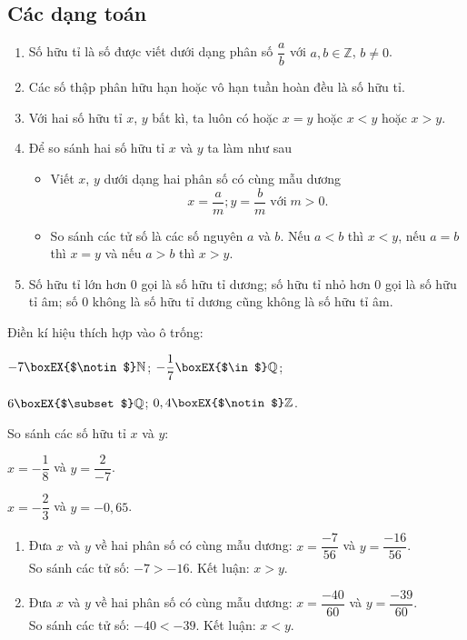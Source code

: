 \subsection{Các dạng toán}
\begin{dang}
\begin{enumerate}[\tickEX]
	\item Số hữu tỉ là số được viết dưới dạng phân số $\dfrac{a}{b}$ với $a, b\in\mathbb{Z}$, $b\not=0$.
	\item Các số thập phân hữu hạn hoặc vô hạn tuần hoàn đều là số hữu tỉ.
	\item Với hai số hữu tỉ $x$, $y$ bất kì, ta luôn có hoặc $x=y$ hoặc $x<y$ hoặc $x>y$.
	\item Để so sánh hai số hữu tỉ $x$ và $y$ ta làm như sau
		\begin{itemize}
			\item Viết $x$, $y$ dưới dạng hai phân số có cùng mẫu dương $$x=\dfrac{a}{m}; y=\dfrac{b}{m}\;\text{với}\;m>0.$$
			\item So sánh các tử số là các số nguyên $a$ và $b$. Nếu $a<b$ thì $x<y$, nếu $a=b$ thì $x=y$ và nếu $a>b$ thì $x>y$.
		\end{itemize}
	\item Số hữu tỉ lớn hơn $0$ gọi là số hữu tỉ dương; số hữu tỉ nhỏ hơn $0$ gọi là số hữu tỉ âm; số $0$ không là số hữu tỉ dương cũng không là số hữu tỉ âm.
\end{enumerate}
\end{dang}

\begin{vd}
Điền kí hiệu thích hợp vào ô trống:
\begin{listEX}[2]
\item $-7\boxEX{$\notin$}\mathbb{N}$; $-\dfrac{1}{7}\boxEX{$\in$}\mathbb{Q}$;
\item $6\boxEX{$\subset$}\mathbb{Q}$; $0,4\boxEX{$\notin$}\mathbb{Z}$.
\end{listEX}
\end{vd}

\begin{vd}
So sánh các số hữu tỉ $x$ và $y$:
\begin{listEX}[2]
	\item $x=-\dfrac{1}{8}$ và $y=\dfrac{2}{-7}$.
	\item $x=-\dfrac{2}{3}$ và $y=-0,65$.
\end{listEX}
\loigiai
{
\begin{enumerate}
\item Đưa $x$ và $y$ về hai phân số có cùng mẫu dương: $x=\dfrac{-7}{56}$ và $y=\dfrac{-16}{56}$.\\
So sánh các tử số: $-7>-16$. Kết luận: $x>y$.
\item Đưa $x$ và $y$ về hai phân số có cùng mẫu dương: $x=\dfrac{-40}{60}$ và $y=\dfrac{-39}{60}$.\\
So sánh các tử số: $-40<-39$. Kết luận: $x<y$.
\end{enumerate}
}
\end{vd}

